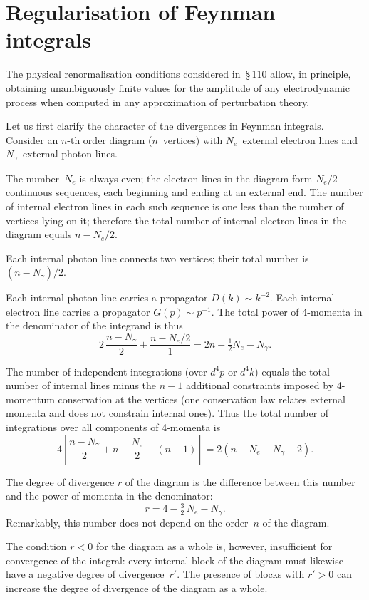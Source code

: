 
\section{Regularisation of Feynman integrals}


The physical renormalisation conditions considered in~\S\,110 allow, in principle, obtaining unambiguously finite values for the amplitude of any electrodynamic process when computed in any approximation of perturbation theory.

Let us first clarify the character of the divergences in Feynman integrals. Consider an $n$-th order diagram ($n$~vertices) with $N_e$~external electron lines and $N_\gamma$~external photon lines.

The number~$N_e$ is always even; the electron lines in the diagram form $N_e/2$ continuous sequences, each beginning and ending at an external end. The number of internal electron lines in each such sequence is one less than the number of vertices lying on it; therefore the total number of internal electron lines in the diagram equals $n - N_e/2$.

Each internal photon line connects two vertices; their total number is $(n - N_\gamma)/2$.

Each internal photon line carries a propagator $D(k) \sim k^{-2}$. Each internal electron line carries a propagator $G(p) \sim p^{-1}$. The total power of 4-momenta in the denominator of the integrand is thus
\[
2\,\frac{n - N_\gamma}{2} + \frac{n - N_e/2}{1} = 2n - \tfrac{1}{2}N_e - N_\gamma.
\]

The number of independent integrations (over $d^4p$ or $d^4k$) equals the total number of internal lines minus the $n - 1$ additional constraints imposed by 4-momentum conservation at the vertices (one conservation law relates external momenta and does not constrain internal ones). Thus the total number of integrations over all components of 4-momenta is
\[
4\!\left[\frac{n - N_\gamma}{2} + n - \frac{N_e}{2} - (n-1)\right] = 2(n - N_e - N_\gamma + 2).
\]

The degree of divergence $r$ of the diagram is the difference between this number and the power of momenta in the denominator:
\begin{equation}
r = 4 - \tfrac{3}{2}\,N_e - N_\gamma.
\label{eq:112.1}
\end{equation}
Remarkably, this number does not depend on the order~$n$ of the diagram.

The condition $r < 0$ for the diagram as a whole is, however, insufficient for convergence of the integral: every internal block of the diagram must likewise have a negative degree of divergence~$r'$. The presence of blocks with $r' > 0$ can increase the degree of divergence of the diagram as a whole.


